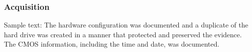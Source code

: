 \subsubsection{Acquisition}

Sample text:
The hardware configuration was documented and a duplicate of the hard drive was created in a manner that protected and preserved the evidence. The CMOS information, including the time and date, was documented. 